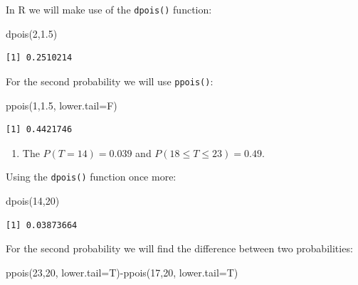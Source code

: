 \documentclass[
  letterpaper,
  DIV=11,
  numbers=noendperiod]{scrreprt}
\newenvironment{Shaded}{\begin{snugshade}}{\end{snugshade}}
\newcommand{\AttributeTok}[1]{\textcolor[rgb]{0.40,0.45,0.13}{#1}}
\newcommand{\DecValTok}[1]{\textcolor[rgb]{0.68,0.00,0.00}{#1}}
\newcommand{\FloatTok}[1]{\textcolor[rgb]{0.68,0.00,0.00}{#1}}
\newcommand{\FunctionTok}[1]{\textcolor[rgb]{0.28,0.35,0.67}{#1}}
\newcommand{\NormalTok}[1]{\textcolor[rgb]{0.00,0.23,0.31}{#1}}
\newcommand{\SpecialCharTok}[1]{\textcolor[rgb]{0.37,0.37,0.37}{#1}}
\providecommand{\tightlist}{%
  \setlength{\itemsep}{0pt}\setlength{\parskip}{0pt}}\usepackage{longtable,booktabs,array}
\begin{document}
In R we will make use of the \texttt{dpois()} function:

\begin{Shaded}
\begin{Highlighting}[numbers=left,,]
\FunctionTok{dpois}\NormalTok{(}\DecValTok{2}\NormalTok{,}\FloatTok{1.5}\NormalTok{)}
\end{Highlighting}
\end{Shaded}

\begin{verbatim}
[1] 0.2510214
\end{verbatim}

For the second probability we will use \texttt{ppois()}:

\begin{Shaded}
\begin{Highlighting}[numbers=left,,]
\FunctionTok{ppois}\NormalTok{(}\DecValTok{1}\NormalTok{,}\FloatTok{1.5}\NormalTok{, }\AttributeTok{lower.tail=}\NormalTok{F)}
\end{Highlighting}
\end{Shaded}

\begin{verbatim}
[1] 0.4421746
\end{verbatim}

\begin{blackbox}

\begin{enumerate}
\def\labelenumi{\arabic{enumi}.}
\setcounter{enumi}{1}
\tightlist
\item
  The \(P(T=14)=0.039\) and \(P(18 \leq T \leq 23)=0.49\).
\end{enumerate}

\end{blackbox}

Using the \texttt{dpois()} function once more:

\begin{Shaded}
\begin{Highlighting}[numbers=left,,]
\FunctionTok{dpois}\NormalTok{(}\DecValTok{14}\NormalTok{,}\DecValTok{20}\NormalTok{)}
\end{Highlighting}
\end{Shaded}

\begin{verbatim}
[1] 0.03873664
\end{verbatim}

For the second probability we will find the difference between two
probabilities:

\begin{Shaded}
\begin{Highlighting}[numbers=left,,]
\FunctionTok{ppois}\NormalTok{(}\DecValTok{23}\NormalTok{,}\DecValTok{20}\NormalTok{, }\AttributeTok{lower.tail=}\NormalTok{T)}\SpecialCharTok{{-}}\FunctionTok{ppois}\NormalTok{(}\DecValTok{17}\NormalTok{,}\DecValTok{20}\NormalTok{, }\AttributeTok{lower.tail=}\NormalTok{T)}
\end{Highlighting}
\end{Shaded}
\end{document}
